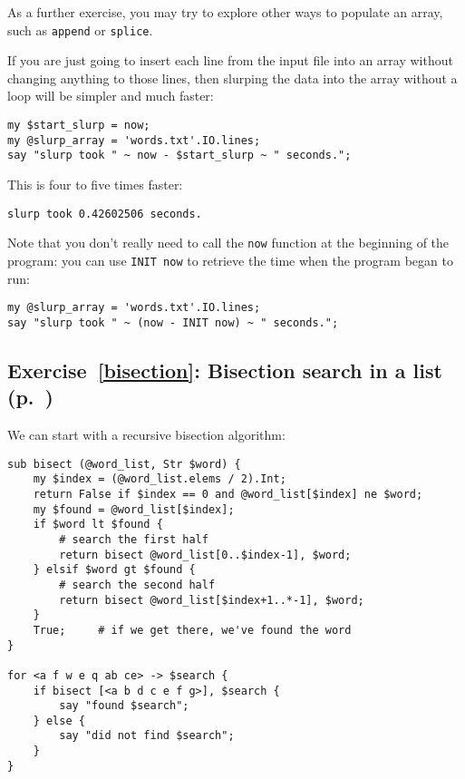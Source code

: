 As a further exercise, you may try to explore other 
ways to populate an array, such as {\tt append} or 
{\tt splice}.

If you are just going to insert each line from the 
input file into an array without changing anything to 
those lines, then slurping the data into the array 
without a loop will be simpler and much faster:

\begin{verbatim}
my $start_slurp = now;
my @slurp_array = 'words.txt'.IO.lines;
say "slurp took " ~ now - $start_slurp ~ " seconds.";
\end{verbatim}

This is four to five times faster:
\begin{verbatim}
slurp took 0.42602506 seconds.
\end{verbatim}

Note that you don't really need to call the \verb'now' 
function at the beginning of the program: you can use 
\verb'INIT now' to retrieve the time when the 
program began to run:

\begin{verbatim}
my @slurp_array = 'words.txt'.IO.lines;
say "slurp took " ~ (now - INIT now) ~ " seconds.";
\end{verbatim}

\subsection{Exercise~\ref{bisection}: Bisection search in a list (p.~\pageref{bisection})}
\label{sol_bisection}

We can start with a recursive bisection algorithm:


\begin{verbatim}
sub bisect (@word_list, Str $word) {
    my $index = (@word_list.elems / 2).Int;
    return False if $index == 0 and @word_list[$index] ne $word;
    my $found = @word_list[$index];
    if $word lt $found {
        # search the first half
        return bisect @word_list[0..$index-1], $word;
    } elsif $word gt $found {
        # search the second half
        return bisect @word_list[$index+1..*-1], $word;
    }
    True;     # if we get there, we've found the word
}

for <a f w e q ab ce> -> $search { 
    if bisect [<a b d c e f g>], $search {
        say "found $search";
    } else {
        say "did not find $search";
    }
}
\end{verbatim}

